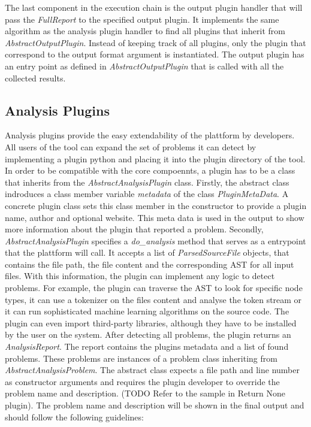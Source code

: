 The last component in the execution chain is the output plugin handler that will pass the \textit{FullReport} to the specified output plugin. It implements the same algorithm as the analysis plugin handler to find all plugins that inherit from \textit{AbstractOutputPlugin}. Instead of keeping track of all plugins, only the plugin that correspond to the output format argument is instantiated. The output plugin has an entry point as defined in \textit{AbstractOutputPlugin}  that is called with all the collected results.

\subsection{Analysis Plugins}
Analysis plugins provide the easy extendability of the plattform by developers. All users of the tool can expand the set of problems it can detect by implementing a plugin python and placing it into the plugin directory of the tool. In order to be compatible with the core compoennts, a plugin has to be a class that inherits from the \textit{AbstractAnalysisPlugin} class. Firstly, the abstract class indroduces a class member variable \textit{metadata} of the class \textit{PluginMetaData}. A concrete plugin class sets this class member in the constructor to provide a plugin name, author and optional website. This meta data is used in the output to show more information about the plugin that reported a problem. Secondly, \textit{AbstractAnalysisPlugin} specifies a \textit{do\_analysis} method that serves as a entrypoint that the plattform will call. It accepts a list of \textit{ParsedSourceFile} objects, that contains the file path, the file content and the corresponding AST for all input files. With this information, the plugin can implement any logic to detect problems. 
For example, the plugin can traverse the AST to look for specific node types, it can use a tokenizer on the files content and analyse the token stream or it can run sophisticated machine learning algorithms on the source code.
The plugin can even import third-party libraries, although they have to be installed by the user on the system. After detecting all problems, the plugin returns an \textit{AnalysisReport}. The report contains the plugins metadata and a list of found problems. These problems are instances  of a problem class inheriting from \textit{AbstractAnalysisProblem}. The abstract class expects a file path and line number as constructor arguments and requires the plugin developer to override the problem name and description. (TODO Refer to the sample in Return None plugin). The problem name and description will be shown in the final output and should follow the following guidelines:
